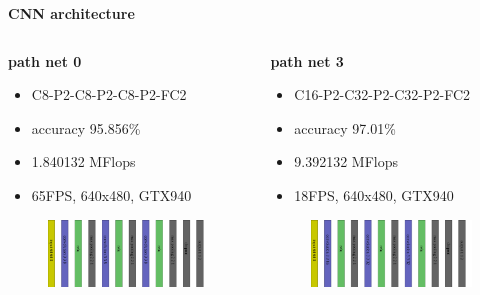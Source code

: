 \documentclass[xcolor=dvipsnames]{beamer}
\begin{document}
\begin{frame}{\bf CNN architecture}

\begin{columns}
\begin{column}{0.5\textwidth}
    {\bf path net 0}
    \begin{itemize}
        \item C8-P2-C8-P2-C8-P2-FC2
        \item accuracy 95.856\%
        \item 1.840132 MFlops
        \item 65FPS, 640x480, GTX940
    \end{itemize}

    \begin{figure}[!htb]
      \includegraphics[scale=0.09]{../../pictures/image_processing/path_net_0.png}
    \end{figure}

\end{column}
\begin{column}{0.5\textwidth}  %

    {\bf path net 3}
    \begin{itemize}
        \item C16-P2-C32-P2-C32-P2-FC2
        \item accuracy 97.01\%
        \item 9.392132 MFlops
        \item 18FPS, 640x480, GTX940
    \end{itemize}

    \begin{figure}[!htb]
      \includegraphics[scale=0.09]{../../pictures/image_processing/path_net_3.png}
    \end{figure}

\end{column}
\end{columns}

\end{frame}
\end{document}
